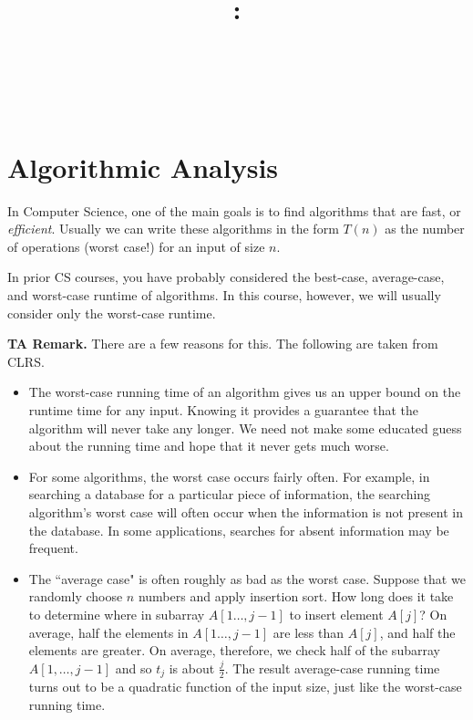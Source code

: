 \documentclass{article}
\title{
    \vspace{2in}
    \textbf{\lectClass:\\ \lectTitle}\\
    \vspace{0.1in}\large{\textit{\lectClassInstructor\ \lectSection}}
    \vspace{3in}
    \author{\textbf{\lectAuthorName}}
    \date{}
}
\begin{document}
\maketitle
\pagebreak

\section*{Algorithmic Analysis}
    In Computer Science, one of the main goals is to find algorithms that are fast, or \textit{efficient}. Usually we can write these algorithms in the form $T(n)$ as the number of operations (worst case!) for an input of size $n$.
    
    \vspace{1.5mm}
    In prior CS courses, you have probably considered the best-case, average-case, and worst-case runtime of algorithms. In this course, however, we will usually consider only the worst-case runtime.
    
    \vspace{1.5mm}\textbf{TA Remark.} There are a few reasons for this. The following are taken from CLRS. 
    \begin{itemize}
        \item The worst-case running time of an algorithm gives us an upper bound on the runtime time for any input. Knowing it provides a guarantee that the algorithm will never take any longer. We need not make some educated guess about the running time and hope that it never gets much worse.
        \item For some algorithms, the worst case occurs fairly often. For example, in searching a database for a particular piece of information, the searching algorithm's worst case will often occur when the information is not present in the database. In some applications, searches for absent information may be frequent.
        \item The ``average case" is often roughly as bad as the worst case. Suppose that we randomly choose $n$ numbers and apply insertion sort. How long does it take to determine where in subarray $A[1\dots, j - 1]$ to insert element $A[j]$? On average, half the elements in $A[1\dots, j - 1]$ are less than $A[j]$, and half the elements are greater. On average, therefore, we check half of the subarray $A[1, \dots, j - 1]$ and so $t_{j}$ is about $\frac{j}{2}$. The result average-case running time turns out to be a quadratic function of the input size, just like the worst-case running time.
    \end{itemize}
    
\end{document}
